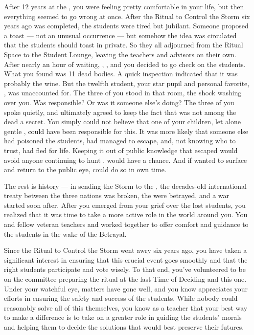 \documentclass[char]{GL2020}
\begin{document}
After 12 years at the \pSchool{}, you were feeling pretty comfortable in your life, but then everything seemed to go wrong at once. After the Ritual to Control the Storm six years ago was completed, the students were tired but jubilant. Someone proposed a toast — not an unusual occurrence — but somehow the idea was circulated that the students should toast in private. So they all adjourned from the Ritual Space to the Student Lounge, leaving the teachers and advisors on their own. After nearly an hour of waiting, \cDiplomat{\full}, \cPrincipal{\full}, and you decided to go check on the students. What you found was 11 dead bodies. A quick inspection indicated that it was probably the wine. But the twelfth student, your star pupil and personal favorite, \cKidScientist{\full}, was unaccounted for. The three of you stood in that room, the shock washing over you. Was \cKidScientist{} responsible? Or was it someone else's doing? The three of you spoke quietly, and ultimately agreed to keep the fact that \cKidScientist{} was not among the dead a secret. You simply could not believe that one of your children, let alone gentle \cKidScientist{}, could have been responsible for this. It was more likely that someone else had poisoned the students, \cKidScientist{} had managed to escape, and, not knowing who to trust, had fled for \cKidScientist{\their} life. Keeping it out of public knowledge that \cKidScientist{\they} escaped would avoid anyone continuing to hunt \cKidScientist{\them}. \cKidScientist{\They} would have a chance. And if \cKidScientist{\they} wanted to surface and return to the public eye, \cKidScientist{\they} could do so in \cKidScientist{\their} own time. 

The rest is history — in sending the Storm to the \pShip{}, the decades-old international treaty between the three nations was broken, the \pShip{} were betrayed, and a war started soon after. After you emerged from your grief over the lost students, you realized that it was time to take a more active role in the world around you. You and fellow veteran teachers \cEthics{\full} and \cFlowPriest{} worked together to offer comfort and guidance to the students in the wake of the Betrayal. 

Since the Ritual to Control the Storm went awry six years ago, you have taken a significant interest in ensuring that this crucial event goes smoothly and that the right students participate and vote wisely. To that end, you've volunteered to be on the committee preparing the ritual at the last Time of Deciding and this one. Under your watchful eye, matters have gone well, and you know \cPrincipal{\full} appreciates your efforts in ensuring the safety and success of the students. While nobody could reasonably solve all of this themselves, you know as a teacher that your best way to make a difference is to take on a greater role in guiding the students' morals and helping them to decide the solutions that would best preserve their futures. 
\end{document}
